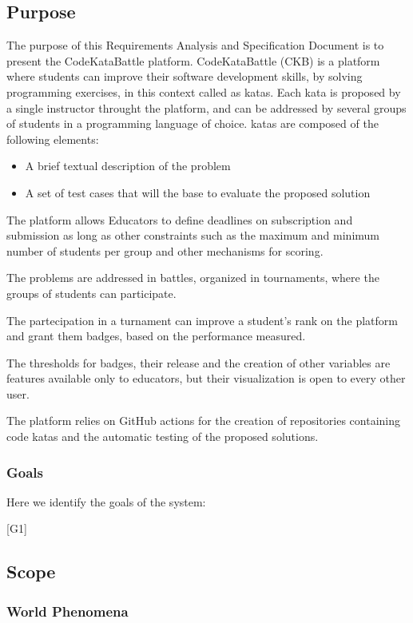 \subsection{Purpose}

The purpose of this Requirements Analysis and Specification Document is to present the CodeKataBattle platform. CodeKataBattle (CKB) is a platform where students can improve their software development skills, by solving programming exercises, in this context called as katas.
Each kata is proposed by a single instructor throught the platform, and can be addressed by several groups of students in a programming language of choice.
katas are composed of the following elements:
\begin{itemize}
    \item A brief textual description of the problem
    \item A set of test cases that will the base to evaluate the proposed solution
\end{itemize}


The platform allows Educators to define deadlines on subscription and submission as long as other constraints such as the maximum and minimum number of students per group and other mechanisms for scoring. 

The problems are addressed in battles, organized in tournaments, where the groups of students can participate. 

The partecipation in a turnament can improve a student's rank on the platform and grant them badges, based on the performance measured.

The thresholds for badges, their release and the creation of other variables are features available only to educators, but their visualization is open to every other user.

The platform relies on GitHub actions for the creation of repositories containing code katas and the automatic testing of the proposed solutions.

\subsubsection{Goals}
Here we identify the goals of the system:

[G1] 

\subsection{Scope}

\subsubsection{World Phenomena}

